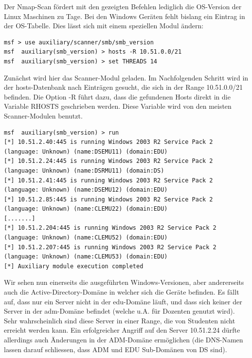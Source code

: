 \documentclass[a4paper,11pt]{scrartcl}
\begin{document}
Der Nmap-Scan fördert mit den gezeigten Befehlen lediglich die OS-Version der Linux Maschinen zu Tage. Bei den Windows Geräten fehlt bislang ein Eintrag in der OS-Tabelle. Dies lässt sich mit einem speziellen Modul ändern:
\begin{lstlisting}
msf > use auxiliary/scanner/smb/smb_version 
msf  auxiliary(smb_version) > hosts -R 10.51.0.0/21
msf  auxiliary(smb_version) > set THREADS 14
\end{lstlisting}
Zunächst wird hier das Scanner-Modul geladen. Im Nachfolgenden Schritt wird in der hosts-Datenbank nach Einträgen gesucht, die sich in der Range 10.51.0.0/21 befinden. Die Option -R führt dazu, dass die gefundenen Hosts direkt in die Variable RHOSTS geschrieben werden. Diese Variable wird von den meisten Scanner-Modulen benutzt.
\begin{lstlisting}
msf  auxiliary(smb_version) > run 
[*] 10.51.2.40:445 is running Windows 2003 R2 Service Pack 2 (language: Unknown) (name:DSEMU11) (domain:EDU)
[*] 10.51.2.24:445 is running Windows 2003 R2 Service Pack 2 (language: Unknown) (name:DSRMU11) (domain:DS)
[*] 10.51.2.41:445 is running Windows 2003 R2 Service Pack 2 (language: Unknown) (name:DSEMU12) (domain:EDU)
[*] 10.51.2.85:445 is running Windows 2003 R2 Service Pack 2 (language: Unknown) (name:CLEMU22) (domain:EDU)
[.......]
[*] 10.51.2.204:445 is running Windows 2003 R2 Service Pack 2 (language: Unknown) (name:CLEMU52) (domain:EDU)
[*] 10.51.2.207:445 is running Windows 2003 R2 Service Pack 2 (language: Unknown) (name:CLEMU53) (domain:EDU)
[*] Auxiliary module execution completed
\end{lstlisting}
Wir sehen nun einerseits die ausgeführten Windows-Versionen, aber andererseits auch die Active-Directory-Domäne in welcher sich die Geräte befinden. Es fällt auf, dass nur ein Server nicht in der edu-Domäne läuft, und dass sich keiner der Server in der adm-Domäne befindet (welche u.A. für Dozenten genutzt wird). Sehr wahrscheinlich sind diese Server in einer Range, die von Studenten nicht erreicht werden kann. Ein erfolgreicher Angriff auf den Server 10.51.2.24 dürfte allerdings auch Änderungen in der ADM-Domäne ermöglichen (die DNS-Namen lassen darauf schliessen, dass ADM und EDU Sub-Domänen von DS sind).
\end{document}
